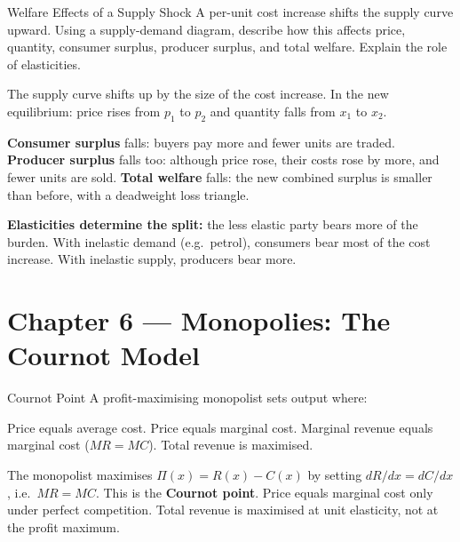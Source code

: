 \documentclass[paper=a5]{scrartcl}
\begin{document}
\begin{question}[type=open]{Welfare Effects of a Supply Shock}
A per-unit cost increase shifts the supply curve upward. Using a supply-demand
diagram, describe how this affects price, quantity, consumer surplus, producer
surplus, and total welfare. Explain the role of elasticities.

\answerlines[7]

\begin{solution}
  The supply curve shifts up by the size of the cost increase. In the new
  equilibrium: price rises from $p_1$ to $p_2$ and quantity falls from $x_1$
  to $x_2$.

  \textbf{Consumer surplus} falls: buyers pay more and fewer units are traded.
  \textbf{Producer surplus} falls too: although price rose, their costs rose
  by more, and fewer units are sold.
  \textbf{Total welfare} falls: the new combined surplus is smaller than before,
  with a deadweight loss triangle.

  \textbf{Elasticities determine the split:} the less elastic party bears more
  of the burden. With inelastic demand (e.g.\ petrol), consumers bear most of
  the cost increase. With inelastic supply, producers bear more.
\end{solution}
\end{question}


\section{Chapter 6 — Monopolies: The Cournot Model}

\begin{question}[type=mc]{Cournot Point}
A profit-maximising monopolist sets output where:
\begin{choices}
  \choice        Price equals average cost.
  \choice        Price equals marginal cost.
  \correctchoice Marginal revenue equals marginal cost ($MR = MC$).
  \choice        Total revenue is maximised.
\end{choices}
\begin{solution}
  The monopolist maximises $\Pi(x) = R(x) - C(x)$ by setting
  $dR/dx = dC/dx$, i.e.\ $MR = MC$. This is the \textbf{Cournot point}.
  Price equals marginal cost only under perfect competition. Total revenue
  is maximised at unit elasticity, not at the profit maximum.
\end{solution}
\end{question}
\end{document}
